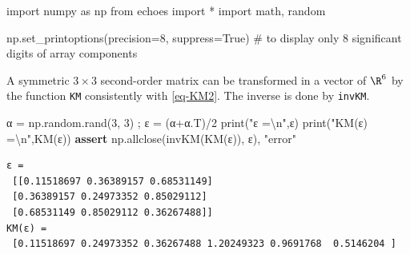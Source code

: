 \documentclass[
  letterpaper,
  DIV=11,
  numbers=noendperiod]{scrreprt}
\newenvironment{Shaded}{\begin{snugshade}}{\end{snugshade}}
\newcommand{\BuiltInTok}[1]{\textcolor[rgb]{0.00,0.23,0.31}{#1}}
\newcommand{\CharTok}[1]{\textcolor[rgb]{0.13,0.47,0.30}{#1}}
\newcommand{\CommentTok}[1]{\textcolor[rgb]{0.37,0.37,0.37}{#1}}
\newcommand{\ControlFlowTok}[1]{\textcolor[rgb]{0.00,0.23,0.31}{\textbf{#1}}}
\newcommand{\DecValTok}[1]{\textcolor[rgb]{0.68,0.00,0.00}{#1}}
\newcommand{\ImportTok}[1]{\textcolor[rgb]{0.00,0.46,0.62}{#1}}
\newcommand{\NormalTok}[1]{\textcolor[rgb]{0.00,0.23,0.31}{#1}}
\newcommand{\OperatorTok}[1]{\textcolor[rgb]{0.37,0.37,0.37}{#1}}
\newcommand{\StringTok}[1]{\textcolor[rgb]{0.13,0.47,0.30}{#1}}
\newcommand{\VariableTok}[1]{\textcolor[rgb]{0.07,0.07,0.07}{#1}}
\begin{document}
\begin{tcolorbox}[enhanced jigsaw, left=2mm, bottomrule=.15mm, colbacktitle=quarto-callout-tip-color!10!white, colback=white, colframe=quarto-callout-tip-color-frame, rightrule=.15mm, bottomtitle=1mm, toptitle=1mm, titlerule=0mm, title={Imports}, toprule=.15mm, arc=.35mm, opacityback=0, opacitybacktitle=0.6, leftrule=.75mm, breakable, coltitle=black]

\begin{Shaded}
\begin{Highlighting}[]
\ImportTok{import}\NormalTok{ numpy }\ImportTok{as}\NormalTok{ np}
\ImportTok{from}\NormalTok{ echoes }\ImportTok{import} \OperatorTok{*}
\ImportTok{import}\NormalTok{ math, random}

\NormalTok{np.set\_printoptions(precision}\OperatorTok{=}\DecValTok{8}\NormalTok{, suppress}\OperatorTok{=}\VariableTok{True}\NormalTok{)}
\CommentTok{\# to display only 8 significant digits of array components}
\end{Highlighting}
\end{Shaded}

\end{tcolorbox}

A symmetric \(3×3\) second-order matrix can be transformed in a vector
of \(\R^6\) by the function \texttt{KM} consistently with \ref{eq-KM2}.
The inverse is done by \texttt{invKM}.

\begin{Shaded}
\begin{Highlighting}[]
\NormalTok{α }\OperatorTok{=}\NormalTok{ np.random.rand(}\DecValTok{3}\NormalTok{, }\DecValTok{3}\NormalTok{) }\OperatorTok{;}\NormalTok{ ε }\OperatorTok{=}\NormalTok{ (α}\OperatorTok{+}\NormalTok{α.T)}\OperatorTok{/}\DecValTok{2}
\BuiltInTok{print}\NormalTok{(}\StringTok{"ε =}\CharTok{\textbackslash{}n}\StringTok{"}\NormalTok{,ε)}
\BuiltInTok{print}\NormalTok{(}\StringTok{"KM(ε) =}\CharTok{\textbackslash{}n}\StringTok{"}\NormalTok{,KM(ε))}
\ControlFlowTok{assert}\NormalTok{ np.allclose(invKM(KM(ε)), ε), }\StringTok{"error"}
\end{Highlighting}
\end{Shaded}

\begin{verbatim}
ε =
 [[0.11518697 0.36389157 0.68531149]
 [0.36389157 0.24973352 0.85029112]
 [0.68531149 0.85029112 0.36267488]]
KM(ε) =
 [0.11518697 0.24973352 0.36267488 1.20249323 0.9691768  0.5146204 ]
\end{verbatim}
\end{document}
